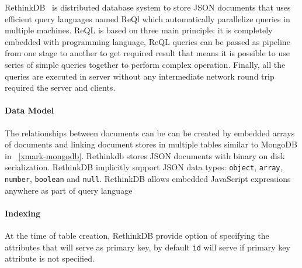 RethinkDB~\cite{rethindb} is distributed database system to store  JSON documents that uses efficient query languages named ReQl which automatically parallelize queries in multiple machines. ReQL is based on three main principle: it is completely embedded with programming language, ReQL queries can be passed as pipeline from one stage to another to get required result that means it is possible to use series of simple queries together to perform complex operation. Finally, all the queries are executed in server without any intermediate network round trip required the server and clients. 
\paragraph{Data Model}
The relationships between documents can be can be created by embedded arrays of documents and linking document stores in multiple tables similar to MongoDB in ~\ref{xmark-mongodb}.
Rethinkdb stores JSON documents with binary on disk serialization. RethinkDB implicitly support JSON data types: \texttt{object}, \texttt{array}, \texttt{number}, \texttt{boolean} and \texttt{null}. 
RethinkDB allows embedded JavaScript expressions anywhere as part of query language

\paragraph{Indexing}
At the time of table creation, RethinkDB provide option of specifying the attributes that will serve as primary key, by default \texttt{id}  will serve if primary key attribute is not specified.